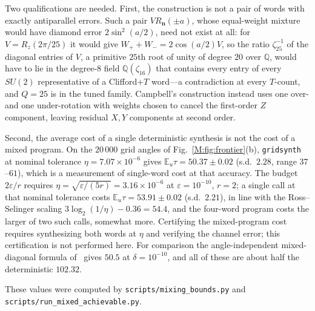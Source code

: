 \documentclass[aps,prx,twocolumn,superscriptaddress,nofootinbib,longbibliography]{revtex4-2}
\theoremstyle{plain}
\theoremstyle{definition}
\theoremstyle{remark}
\newcommand{\E}{\mathbb{E}}
\newcommand{\Q}{\mathbb{Q}}
\begin{document}
Two qualifications are needed. First, the construction is not a pair of words with exactly antiparallel errors. Such a pair $VR_{\mathbf n}(\pm a)$, whose equal-weight mixture would have diamond error $2\sin^2(a/2)$, need not exist at all: for $V=R_z(2\pi/25)$ it would give $W_++W_-=2\cos(a/2)V$, so the ratio $\zeta_{25}^{-1}$ of the diagonal entries of $V$, a primitive $25$th root of unity of degree $20$ over $\Q$, would have to lie in the degree-$8$ field $\Q(\zeta_{16})$ that contains every entry of every $SU(2)$ representative of a Clifford+$T$ word---a contradiction at every $T$-count, and $Q=25$ is in the tuned family. Campbell's construction instead uses one over- and one under-rotation with weights chosen to cancel the first-order $Z$ component, leaving residual $X,Y$ components at second order. 

Second, the average cost of a single deterministic synthesis is not the cost of a mixed program. On the $20\,000$ grid angles of Fig.~\ref{M:fig:frontier}(b), \texttt{gridsynth} at nominal tolerance $\eta=7.07\times10^{-6}$ gives $\E_u\tau=50.37\pm0.02$ (s.d.\ $2.28$, range $37$--$61$), which is a measurement of single-word cost at that accuracy. The budget $2\varepsilon/r$ requires $\eta=\sqrt{\varepsilon/(5r)}=3.16\times10^{-6}$ at $\varepsilon=10^{-10}$, $r=2$; a single call at that nominal tolerance costs $\E_u\tau=53.91\pm0.02$ (s.d.\ $2.21$), in line with the Ross--Selinger scaling $3\log_2(1/\eta)-0.36=54.4$, and the four-word program costs the larger of two such calls, somewhat more. Certifying the mixed-program cost requires synthesizing both words at $\eta$ and verifying the channel error; this certification is not performed here. For comparison the angle-independent mixed-diagonal formula of~\cite{KLMPP,Bothe} gives $50.5$ at $\delta=10^{-10}$, and all of these are about half the deterministic $102.32$. 

These values were computed by \texttt{scripts/mixing\_bounds.py} and \texttt{scripts/run\_mixed\_achievable.py}.
\end{document}
